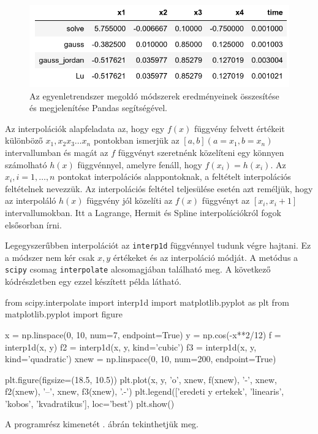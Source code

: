 \begin{figure}[h!]
\centering
\includegraphics[width=\textwidth]{img/leq_summary.png}
\caption{Az egyenletrendszer megoldó módszerek eredményeinek összesítése és megjelenítése Pandas segítségével.}
\label{fig:leq-summary}
\end{figure}


    Az interpolációk alapfeladata az, hogy egy \(f(x)\) függvény felvett
értékeit különböző \(x_1, x_2 x_3 \dots x_n\) pontokban ismerjük az
\([a,b](a=x_1, b=x_n)\) intervallumban és magát az \(f\) függvényt
szeretnénk közelíteni egy könnyen számolható \(h(x)\) függvénnyel,
amelyre fenáll, hogy \(f(x_i)=h(x_i)\). Az \({x_i}, i=1, \ldots, n\) pontokat
interpolációs alappontoknak, a feltételt interpolációs feltételnek
nevezzük. Az interpolációs feltétel teljesülése esetén azt reméljük,
hogy az interpoláló \(h(x)\) függvény jól közelíti az \(f(x)\) függvényt
az \([x_i, x_i + 1]\) intervallumokban. Itt a Lagrange, Hermit és Spline
interpolációkról fogok elsősorban írni.

    Legegyszerűbben interpolációt az \texttt{interp1d} függvénnyel tudunk
végre hajtani. Ez a módszer nem kér csak \(x, y\) értékeket és az
interpoláció módját. A metódus a \texttt{scipy} csomag \texttt{interpolate} alcsomagjában található
meg.
A következő kódrészletben egy ezzel készített példa látható.
\begin{python}
from scipy.interpolate import interp1d
import matplotlib.pyplot as plt
from matplotlib.pyplot import figure

x = np.linspace(0, 10, num=7, endpoint=True)
y = np.cos(-x**2/12)
f = interp1d(x, y)
f2 = interp1d(x, y, kind='cubic')
f3 = interp1d(x, y, kind='quadratic')
xnew = np.linspace(0, 10, num=200, endpoint=True)

plt.figure(figsize=(18.5, 10.5))
plt.plot(x, y, 'o',
    xnew, f(xnew), '-', xnew, f2(xnew), '--', xnew, f3(xnew), '.-')
plt.legend(['eredeti y ertekek', 'linearis', 'kobos', 'kvadratikus'],
    loc='best')
plt.show()
\end{python}
A programrész kimenetét . ábrán tekinthetjük meg.

